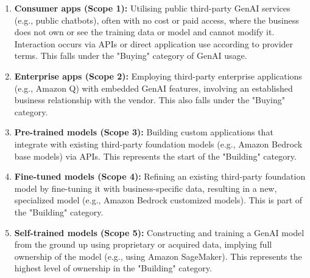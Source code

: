 \begin{enumerate}
    \item \textbf{Consumer apps (Scope 1):} Utilising public third-party GenAI services (e.g., public chatbots), often with no cost or paid access, where the business does not own or see the training data or model and cannot modify it. Interaction occurs via APIs or direct application use according to provider terms\cite{noauthor_securing_2023}\cite{noauthor_securing_nodate}. This falls under the "Buying" category of GenAI usage\cite{noauthor_securing_nodate}.
    \item \textbf{Enterprise apps (Scope 2):} Employing third-party enterprise applications (e.g., Amazon Q) with embedded GenAI features, involving an established business relationship with the vendor\cite{noauthor_securing_2023}\cite{noauthor_securing_nodate}. This also falls under the "Buying" category\cite{noauthor_securing_nodate}.
    \item \textbf{Pre-trained models (Scope 3):} Building custom applications that integrate with existing third-party foundation models (e.g., Amazon Bedrock base models) via APIs\cite{noauthor_securing_2023}\cite{noauthor_securing_nodate}. This represents the start of the "Building" category\cite{noauthor_securing_nodate}.
    \item \textbf{Fine-tuned models (Scope 4):} Refining an existing third-party foundation model by fine-tuning it with business-specific data, resulting in a new, specialized model (e.g., Amazon Bedrock customized models)\cite{noauthor_securing_2023}\cite{noauthor_securing_nodate}. This is part of the "Building" category\cite{noauthor_securing_nodate}.
    \item \textbf{Self-trained models (Scope 5):} Constructing and training a GenAI model from the ground up using proprietary or acquired data, implying full ownership of the model (e.g., using Amazon SageMaker)\cite{noauthor_securing_2023}\cite{noauthor_securing_nodate}. This represents the highest level of ownership in the "Building" category\cite{noauthor_securing_nodate}.
\end{enumerate}

